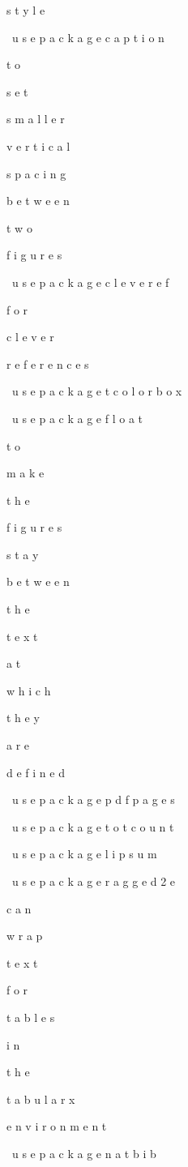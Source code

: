 s
t
y
l
e

\
u
s
e
p
a
c
k
a
g
e
{
c
a
p
t
i
o
n
}
 
%
 
t
o
 
s
e
t
 
s
m
a
l
l
e
r
 
v
e
r
t
i
c
a
l
 
s
p
a
c
i
n
g
 
b
e
t
w
e
e
n
 
t
w
o
 
f
i
g
u
r
e
s

\
u
s
e
p
a
c
k
a
g
e
{
c
l
e
v
e
r
e
f
}
 
%
 
f
o
r
 
c
l
e
v
e
r
 
r
e
f
e
r
e
n
c
e
s

\
u
s
e
p
a
c
k
a
g
e
{
t
c
o
l
o
r
b
o
x
}

\
u
s
e
p
a
c
k
a
g
e
{
f
l
o
a
t
}
 
%
 
t
o
 
m
a
k
e
 
t
h
e
 
f
i
g
u
r
e
s
 
s
t
a
y
 
b
e
t
w
e
e
n
 
t
h
e
 
t
e
x
t
 
a
t
 
w
h
i
c
h
 
t
h
e
y
 
a
r
e
 
d
e
f
i
n
e
d

\
u
s
e
p
a
c
k
a
g
e
{
p
d
f
p
a
g
e
s
}

\
u
s
e
p
a
c
k
a
g
e
{
t
o
t
c
o
u
n
t
}

\
u
s
e
p
a
c
k
a
g
e
{
l
i
p
s
u
m
}

\
u
s
e
p
a
c
k
a
g
e
{
r
a
g
g
e
d
2
e
}
 
%
 
c
a
n
 
w
r
a
p
 
t
e
x
t
 
f
o
r
 
t
a
b
l
e
s
 
i
n
 
t
h
e
 
t
a
b
u
l
a
r
x
 
e
n
v
i
r
o
n
m
e
n
t

\
u
s
e
p
a
c
k
a
g
e
{
n
a
t
b
i
b
}
 
